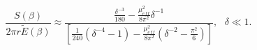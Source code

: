 \begin{equation}
\frac{S\left(\beta \right)}{2\pi r\widetilde{E}\left(\beta \right)}\approx \frac{\frac{\delta ^{-3}}{180}-\frac{\mu _{eff}^{2}}{8\pi ^{2}}\delta ^{-1}}{\left[\frac{1}{240}\left(\delta ^{-4}-1\right)-\frac{\mu _{eff}^{2}}{8\pi ^{2}}\left(\delta ^{-2}-\frac{\pi ^{2}}{6}\right)\right]},\, \, \, \, \delta \ll 1.\label{ratio one}\end{equation}

